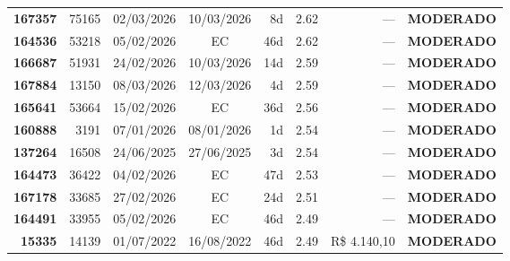 \documentclass[a4paper,10pt]{article}
\begin{document}
\begin{center}
\begin{longtable}{>{\scriptsize}r>{\scriptsize}r>{\scriptsize}c>{\scriptsize}c>{\scriptsize}r>{\scriptsize}r>{\scriptsize}r>{\scriptsize}l}
\textcolor{anomyellow}{\textbf{167357}} & 75165 & 02/03/2026 & 10/03/2026 & 8d & \textcolor{anomyellow}{2.62} & --- & \textcolor{anomyellow}{\textbf{MODERADO}} \\

\textcolor{anomyellow}{\textbf{164536}} & 53218 & 05/02/2026 & \textcolor{anomorange}{EC} & 46d & \textcolor{anomyellow}{2.62} & --- & \textcolor{anomyellow}{\textbf{MODERADO}} \\

\textcolor{anomyellow}{\textbf{166687}} & 51931 & 24/02/2026 & 10/03/2026 & 14d & \textcolor{anomyellow}{2.59} & --- & \textcolor{anomyellow}{\textbf{MODERADO}} \\

\textcolor{anomyellow}{\textbf{167884}} & 13150 & 08/03/2026 & 12/03/2026 & 4d & \textcolor{anomyellow}{2.59} & --- & \textcolor{anomyellow}{\textbf{MODERADO}} \\

\textcolor{anomyellow}{\textbf{165641}} & 53664 & 15/02/2026 & \textcolor{anomorange}{EC} & 36d & \textcolor{anomyellow}{2.56} & --- & \textcolor{anomyellow}{\textbf{MODERADO}} \\

\textcolor{anomyellow}{\textbf{160888}} & 3191 & 07/01/2026 & 08/01/2026 & 1d & \textcolor{anomyellow}{2.54} & --- & \textcolor{anomyellow}{\textbf{MODERADO}} \\

\textcolor{anomyellow}{\textbf{137264}} & 16508 & 24/06/2025 & 27/06/2025 & 3d & \textcolor{anomyellow}{2.54} & --- & \textcolor{anomyellow}{\textbf{MODERADO}} \\

\textcolor{anomyellow}{\textbf{164473}} & 36422 & 04/02/2026 & \textcolor{anomorange}{EC} & 47d & \textcolor{anomyellow}{2.53} & --- & \textcolor{anomyellow}{\textbf{MODERADO}} \\

\textcolor{anomyellow}{\textbf{167178}} & 33685 & 27/02/2026 & \textcolor{anomorange}{EC} & 24d & \textcolor{anomyellow}{2.51} & --- & \textcolor{anomyellow}{\textbf{MODERADO}} \\

\textcolor{anomyellow}{\textbf{164491}} & 33955 & 05/02/2026 & \textcolor{anomorange}{EC} & 46d & \textcolor{anomyellow}{2.49} & --- & \textcolor{anomyellow}{\textbf{MODERADO}} \\

\textcolor{anomyellow}{\textbf{15335}} & 14139 & 01/07/2022 & 16/08/2022 & 46d & \textcolor{anomyellow}{2.49} & R\$ 4.140,10 & \textcolor{anomyellow}{\textbf{MODERADO}} \\


\end{longtable}
\end{center}
\end{document}
